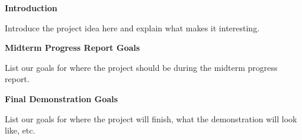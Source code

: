 \begin{large}
    \noindent\textbf{Introduction}
\end{large}

\vspace{5pt}

Introduce the project idea here and explain what makes it interesting.

\vspace{5pt}

\begin{large}
    \noindent\textbf{Midterm Progress Report Goals}
\end{large}

List our goals for where the project should be during the midterm progress report.

\vspace{5pt}

\begin{large}
    \noindent\textbf{Final Demonstration Goals}
\end{large}

List our goals for where the project will finish, what the demonstration will look like, etc.

\pagebreak